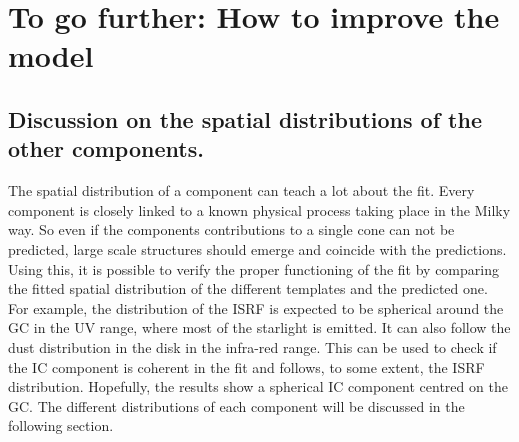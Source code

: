 \chapter{To go further: How to improve the model}
\label{ch:discussion}


%	

%		


\section{Discussion on the spatial distributions of the other components.}

The spatial distribution of a component can teach a lot about the fit. Every component is closely linked to a known physical process taking place in the Milky way. So even if the components contributions to a single cone can not be predicted, large scale structures  should emerge and coincide with the predictions. Using this, it is possible to verify the proper functioning of the fit by comparing the fitted spatial distribution of the different templates and the predicted one.
For example, the distribution of the ISRF is expected to be spherical around the GC in the UV range, where most of the starlight is emitted. It can also follow the dust distribution in the disk in the infra-red range. This can be used to check if the IC component is coherent in the fit and follows, to some extent, the ISRF distribution. Hopefully, the results show a spherical IC component centred on the GC.
The different distributions of each component will be discussed in the following section.

